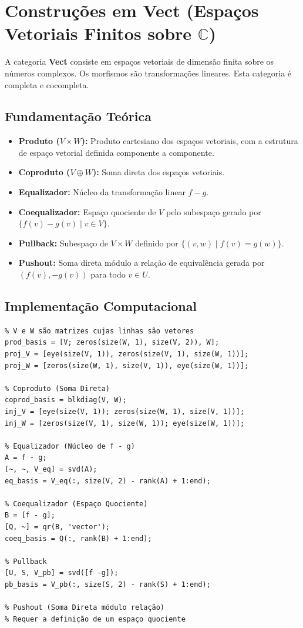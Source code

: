 \section{Construções em Vect (Espaços Vetoriais Finitos sobre \texorpdfstring{$\mathbb{C}$}{C})}

A categoria \textbf{Vect} consiste em espaços vetoriais de dimensão finita sobre os números complexos. Os morfismos são transformações lineares. Esta categoria é completa e cocompleta.

\subsection{Fundamentação Teórica}
\begin{itemize}
    \item \textbf{Produto ($V \times W$):} Produto cartesiano dos espaços vetoriais, com a estrutura de espaço vetorial definida componente a componente.
    \item \textbf{Coproduto ($V \oplus W$):} Soma direta dos espaços vetoriais.
    \item \textbf{Equalizador:} Núcleo da transformação linear $f - g$.
    \item \textbf{Coequalizador:} Espaço quociente de $V$ pelo subespaço gerado por $\{f(v) - g(v) \mid v \in V\}$.
    \item \textbf{Pullback:} Subespaço de $V \times W$ definido por $\{(v, w) \mid f(v) = g(w)\}$.
    \item \textbf{Pushout:} Soma direta módulo a relação de equivalência gerada por $(f(v), -g(v))$ para todo $v \in U$.
\end{itemize}

\subsection{Implementação Computacional}
\begin{lstlisting}[caption={Construções Universais em Vect}]
% Produto e Projeções
% V e W são matrizes cujas linhas são vetores
prod_basis = [V; zeros(size(W, 1), size(V, 2)), W];
proj_V = [eye(size(V, 1)), zeros(size(V, 1), size(W, 1))];
proj_W = [zeros(size(W, 1), size(V, 1)), eye(size(W, 1))];

% Coproduto (Soma Direta)
coprod_basis = blkdiag(V, W);
inj_V = [eye(size(V, 1)); zeros(size(W, 1), size(V, 1))];
inj_W = [zeros(size(V, 1), size(W, 1)); eye(size(W, 1))];

% Equalizador (Núcleo de f - g)
A = f - g;
[~, ~, V_eq] = svd(A);
eq_basis = V_eq(:, size(V, 2) - rank(A) + 1:end);

% Coequalizador (Espaço Quociente)
B = [f - g];
[Q, ~] = qr(B, 'vector');
coeq_basis = Q(:, rank(B) + 1:end);

% Pullback
[U, S, V_pb] = svd([f -g]);
pb_basis = V_pb(:, size(S, 2) - rank(S) + 1:end);

% Pushout (Soma Direta módulo relação)
% Requer a definição de um espaço quociente
\end{lstlisting}
